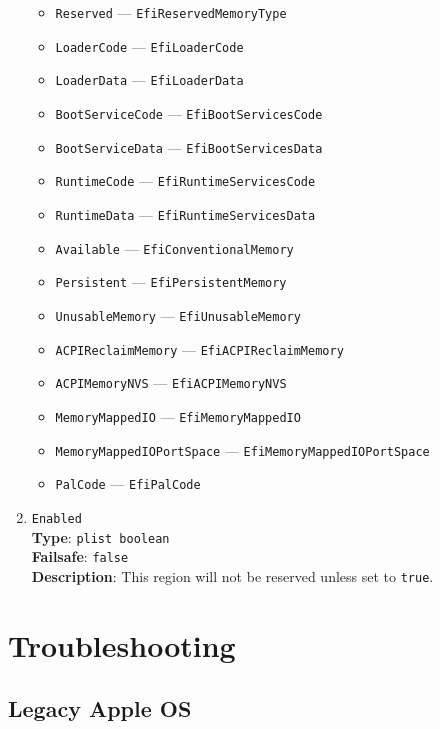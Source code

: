 \documentclass[]{article}
\providecommand{\tightlist}{%
  \setlength{\itemsep}{0pt}\setlength{\parskip}{0pt}}
\begin{document}
\begin{enumerate}
  \begin{itemize}
    \tightlist
    \item \texttt{Reserved} --- \texttt{EfiReservedMemoryType}
    \item \texttt{LoaderCode} --- \texttt{EfiLoaderCode}
    \item \texttt{LoaderData} --- \texttt{EfiLoaderData}
    \item \texttt{BootServiceCode} --- \texttt{EfiBootServicesCode}
    \item \texttt{BootServiceData} --- \texttt{EfiBootServicesData}
    \item \texttt{RuntimeCode} --- \texttt{EfiRuntimeServicesCode}
    \item \texttt{RuntimeData} --- \texttt{EfiRuntimeServicesData}
    \item \texttt{Available} --- \texttt{EfiConventionalMemory}
    \item \texttt{Persistent} --- \texttt{EfiPersistentMemory}
    \item \texttt{UnusableMemory} --- \texttt{EfiUnusableMemory}
    \item \texttt{ACPIReclaimMemory} --- \texttt{EfiACPIReclaimMemory}
    \item \texttt{ACPIMemoryNVS} --- \texttt{EfiACPIMemoryNVS}
    \item \texttt{MemoryMappedIO} --- \texttt{EfiMemoryMappedIO}
    \item \texttt{MemoryMappedIOPortSpace} --- \texttt{EfiMemoryMappedIOPortSpace}
    \item \texttt{PalCode} --- \texttt{EfiPalCode}
  \end{itemize}

\item
  \texttt{Enabled}\\
  \textbf{Type}: \texttt{plist\ boolean}\\
  \textbf{Failsafe}: \texttt{false}\\
  \textbf{Description}: This region will not be reserved unless set to \texttt{true}.

\end{enumerate}

\section{Troubleshooting}\label{troubleshooting}

\subsection{Legacy Apple OS}\label{legacyapple}
\end{document}
